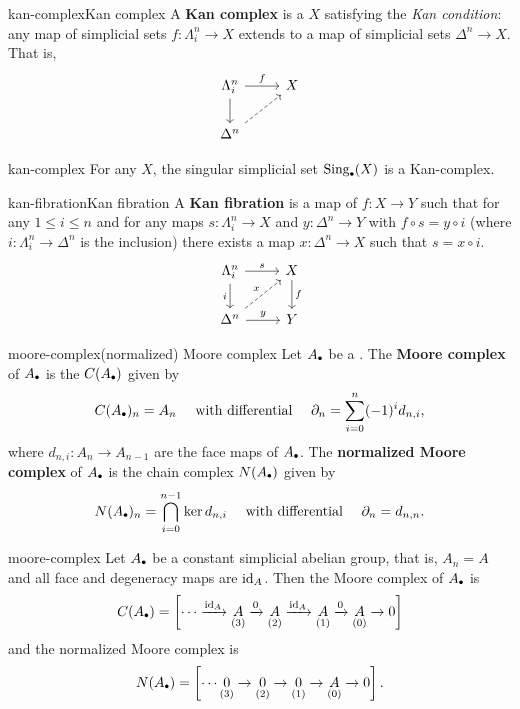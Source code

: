 \begin{topic}{kan-complex}{Kan complex}
    A \textbf{Kan complex} is a  $X$ satisfying the \textit{Kan condition}: any map of simplicial sets $f \colon \Lambda^n_i \to X$ extends to a map of simplicial sets $\Delta^n \to X$. That is,
    \[ \svg \begin{tikzcd} \Lambda^n_i \arrow{r}{f} \arrow{d} & X \\ \Delta^n \arrow[dashed]{ur} & \end{tikzcd} \]
\end{topic}

\begin{example}{kan-complex}
    For any  $X$, the singular simplicial set $\textup{Sing}_\bdot(X)$ is a Kan-complex.
\end{example}

\begin{topic}{kan-fibration}{Kan fibration}
    A \textbf{Kan fibration} is a map of  $f \colon X \to Y$ such that for any $1 \le i \le n$ and for any maps $s \colon \Lambda^n_i \to X$ and $y \colon \Delta^n \to Y$ with $f \circ s = y \circ i$ (where $i \colon \Lambda^n_i \to \Delta^n$ is the inclusion) there exists a map $x \colon \Delta^n \to X$ such that $s = x \circ i$.
    \[ \svg \begin{tikzcd} \Lambda^n_i \arrow{r}{s} \arrow[swap]{d}{i} & X \arrow{d}{f} \\ \Delta^n \arrow{r}{y} \arrow[dashed]{ur}{x} & Y \end{tikzcd} \]
\end{topic}

\begin{topic}{moore-complex}{(normalized) Moore complex}
    Let $A_\bdot$ be a  . The \textbf{Moore complex} of $A_\bdot$ is the  $C(A_\bdot)$ given by
    \[ C(A_\bdot)_n = A_n \quad \textup{ with differential } \quad \partial_n = \sum_{i = 0}^{n} (-1)^i d_{n, i} , \]
    where $d_{n, i} \colon A_n \to A_{n - 1}$ are the face maps of $A_\bdot$. The \textbf{normalized Moore complex} of $A_\bdot$ is the chain complex $N(A_\bdot)$ given by
    \[ N(A_\bdot)_n = \bigcap_{i = 0}^{n - 1} \ker d_{n, i} \quad \text{ with differential } \quad \partial_n = d_{n, n} . \]
\end{topic}

\begin{example}{moore-complex}
    Let $A_\bdot$ be a constant simplicial abelian group, that is, $A_n = A$ and all face and degeneracy maps are $\textup{id}_A$. Then the Moore complex of $A_\bdot$ is
    \[ C(A_\bdot) = \left[ \cdots \xrightarrow{\id_A} \underset{(3)}{A} \xrightarrow{0} \underset{(2)}{A} \xrightarrow{\id_A} \underset{(1)}{A} \xrightarrow{0} \underset{(0)}{A} \to 0 \right] \]
    and the normalized Moore complex is
    \[ N(A_\bdot) = \left[ \cdots \underset{(3)}{0} \to \underset{(2)}{0} \to \underset{(1)}{0} \to \underset{(0)}{A} \to 0 \right] . \]
\end{example}

